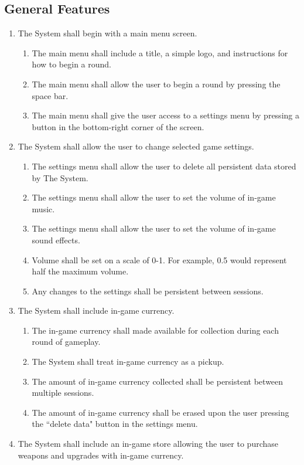 \documentclass[12pt]{report}
\newenvironment{reqlist}{
	\renewcommand{\labelenumi}{\tab\thesubsection.\arabic{enumi}}
	\renewcommand{\labelenumii}{\thesubsection.\arabic{enumi}.\arabic{enumii}}
	\begin{enumerate}[itemsep = 1pt, parsep = 0pt, leftmargin = *]
}{\end{enumerate}}
\begin{document}
	\subsection{General Features}
		\begin{reqlist}
			\item The System shall begin with a main menu screen.
			\begin{reqlist}
				\item The main menu shall include a title, a simple logo, and instructions for how to begin a round.
				\item The main menu shall allow the user to begin a round by pressing the space bar.
				\item The main menu shall give the user access to a settings menu by pressing a button in the bottom-right corner of the screen.
			\end{reqlist}
			\item The System shall allow the user to change selected game settings.
			\begin{reqlist}
				\item The settings menu shall allow the user to delete all persistent data stored by The System.
				\item The settings menu shall allow the user to set the volume of in-game music.
				\item The settings menu shall allow the user to set the volume of in-game sound effects.
				\item Volume shall be set on a scale of 0-1. For example, 0.5 would represent half the maximum volume.
				\item Any changes to the settings shall be persistent between sessions.
			\end{reqlist}
			\item The System shall include in-game currency.
			\begin{reqlist}
				\item The in-game currency shall made available for collection during each round of gameplay.
				\item The System shall treat in-game currency as a pickup.
				\item The amount of in-game currency collected shall be persistent between multiple sessions.
				\item The amount of in-game currency shall be erased upon the user pressing the ``delete data" button in the settings menu.
			\end{reqlist}
			\item The System shall include an in-game store allowing the user to purchase weapons and upgrades with in-game currency.

\end{reqlist}
\end{document}

